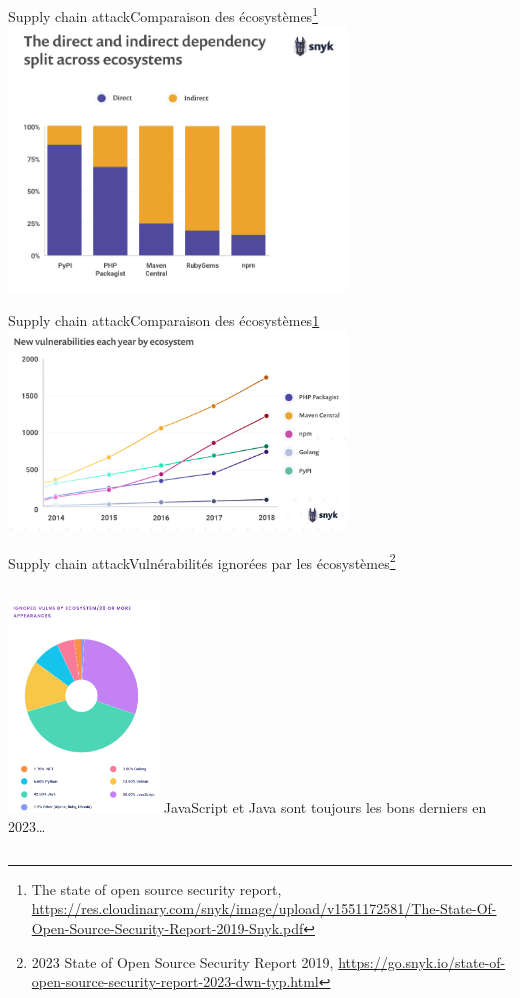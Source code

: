\documentclass{beamer}
\begin{document}
    \begin{frame}{Supply chain attack}{Comparaison des écosystèmes\footnote{\label{snyk}The state of open source security report, \url{https://res.cloudinary.com/snyk/image/upload/v1551172581/The-State-Of-Open-Source-Security-Report-2019-Snyk.pdf}}}
        \centering
        \includegraphics[width=9cm]{image/vuln-direct-indirect-dependencies}
    \end{frame}

    \begin{frame}{Supply chain attack}{Comparaison des écosystèmes\cref{snyk}}
        \centering
        \includegraphics[width=9cm]{image/vuln-created}
    \end{frame}

    \begin{frame}{Supply chain attack}{Vulnérabilités ignorées par les écosystèmes\footnote{\label{snyk2023}2023 State of Open Source Security Report 2019, \url{https://go.snyk.io/state-of-open-source-security-report-2023-dwn-typ.html}}}
        \centering
        \begin{columns}
            \includegraphics[width=4cm]{image/vuln-by-ecosystem}
            JavaScript et Java sont toujours les bons derniers en 2023\ldots
        \end{columns}
    \end{frame}
\end{document}
